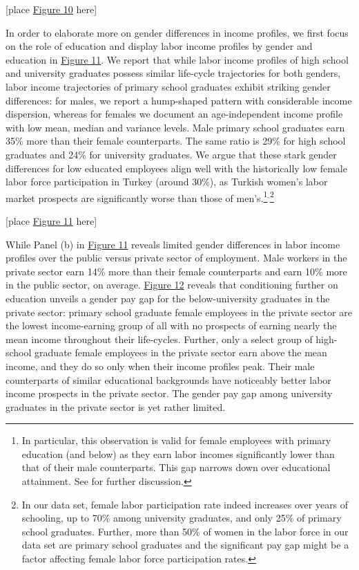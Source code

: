 \documentclass[12pt,author-year]{article}
\begin{document}
\begin{center}
	[place \hyperref[figure10]{Figure 10} here]
\end{center}

In order to elaborate more on gender differences in income profiles, we first focus on the role of education and display labor income profiles by gender and education in \hyperref[figure11]{Figure 11}. We report that while labor income profiles of high school and university graduates possess similar life-cycle trajectories for both genders, labor income trajectories of primary school graduates exhibit striking gender differences: for males, we report a hump-shaped pattern with considerable income dispersion, whereas for females we document an age-independent income profile with low mean, median and variance levels. Male primary school graduates earn 35\% more than their female counterparts. The same ratio is 29\% for high school graduates and 24\% for university graduates. We argue that these stark gender differences for low educated employees align well with the historically low female labor force participation in Turkey (around 30\%), as Turkish women's labor market prospects are significantly worse than those of men's.\footnote{In particular, this observation is valid for female employees with primary education (and below) as they earn labor incomes significantly lower than that of their male counterparts. This gap narrows down over educational attainment. See \cite{SPO2010} for further discussion.}$^,$\footnote{In our data set, female labor participation rate indeed increases over years of schooling, up to 70\% among university graduates, and only 25\% of primary school graduates. Further, more than 50\% of women in the labor force in our data set are primary school graduates and the significant pay gap might be a factor affecting female labor force participation rates.} 

\begin{center}
	[place \hyperref[figure11]{Figure 11} here]
\end{center}

While Panel (b) in \hyperref[figure11]{Figure 11} reveals limited gender differences in labor income profiles over the public versus private sector of employment. Male workers in the private sector earn 14\% more than their female counterparts and earn 10\% more in the public sector, on average. \hyperref[figure12]{Figure 12} reveals that conditioning further on education unveils a gender pay gap for the below-university graduates in the private sector: primary school graduate female employees in the private sector are the lowest income-earning group of all with no prospects of earning nearly the mean income throughout their life-cycles. Further, only a select group of high-school graduate female employees in the private sector earn above the mean income, and they do so only when their income profiles peak. Their male counterparts of similar educational backgrounds have noticeably better labor income prospects in the private sector. The gender pay gap among university graduates in the private sector is yet rather limited. 
\end{document}
